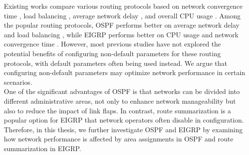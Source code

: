 \documentclass{uiucthesis2021}
\begin{document}

\noindent Existing works compare various routing protocols based on network convergence time \cite{10.1145/1070873.1070877,7399308,tsegaye2012ospf,okonkwo2020comparative}, load balancing \cite{7399308}, average network delay \cite{6636217,8067958,9358327}, and overall CPU usage \cite{121955,6533929}. Among the popular routing protocols, OSPF performs better on average network delay and load balancing \cite{7399308}, while EIGRP performs better on CPU usage and network convergence time \cite{6533929}. However, most previous studies have not explored the potential benefits of configuring non-default parameters for these routing protocols, with default parameters often being used instead. We argue that configuring non-default parameters may optimize network performance in certain scenarios. \\

\noindent One of the significant advantages of OSPF is that networks can be divided into different administrative areas, not only to enhance network manageability but also to reduce the impact of link flaps. In contrast, route summarization is a popular option for EIGRP that network operators often disable in configuration. Therefore, in this thesis, we further investigate OSPF and EIGRP by examining how network performance is affected by area assignments in OSPF and route summarization in EIGRP. \\
\end{document}
